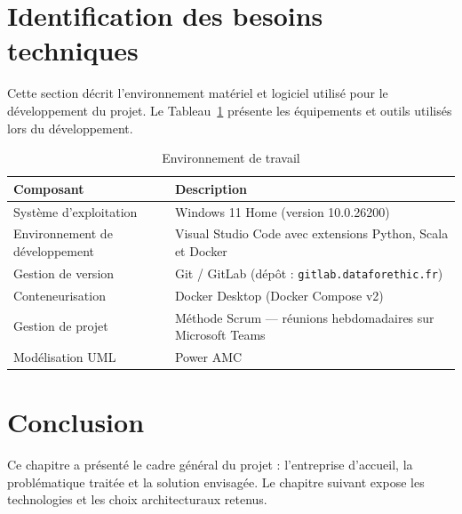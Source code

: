 \section{Identification des besoins techniques}

Cette section décrit l'environnement matériel et logiciel utilisé pour le développement du projet.
Le Tableau~\ref{tab:env_travail} présente les équipements et outils utilisés lors du développement.

\vspace{6pt}
\begin{table}[H]
\caption{Environnement de travail}
\label{tab:env_travail}
\centering
\small
\setlength{\tabcolsep}{4pt}
\begin{tabular}{|p{4cm}|p{10.5cm}|}
\hline
\textbf{Composant} & \textbf{Description} \\
\hline
Système d'exploitation & Windows 11 Home (version 10.0.26200) \\
\hline
Environnement de développement & Visual Studio Code avec extensions Python, Scala et Docker \\
\hline
Gestion de version    & Git / GitLab (dépôt : \texttt{gitlab.dataforethic.fr}) \\
\hline
Conteneurisation      & Docker Desktop (Docker Compose v2) \cite{docker} \\
\hline
Gestion de projet     & Méthode Scrum \cite{scrumguide} — réunions hebdomadaires sur Microsoft Teams \\
\hline
Modélisation UML      & Power AMC \\
\hline
\end{tabular}
\end{table}

\section*{Conclusion}

Ce chapitre a présenté le cadre général du projet : l'entreprise d'accueil,
la problématique traitée et la solution envisagée. Le chapitre suivant
expose les technologies et les choix architecturaux retenus.
